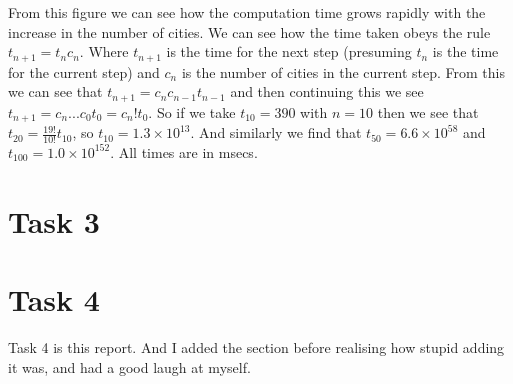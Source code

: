 \documentclass{article}
\begin{document}
From this figure we can see how the computation time grows rapidly with the increase in the number of cities. We can see how the time taken obeys the rule $t_{n+1} = t_n c_n$. Where $t_{n+1}$ is the time for the next step (presuming $t_n$ is the time for the current step) and $c_n$ is the number of cities in the current step. From this we can see that $t_{n+1}=c_n c_{n-1} t_{n-1}$ and then continuing this we see $t_{n+1} = c_n ... c_0 t_0 = c_n ! t_0$. So if we take $t_10 = 390$ with $n=10$ then we see that $t_20 = \frac{19!}{10!}t_{10}$, so $t_{10}=1.3 \times 10^{13}$. And similarly we find that $t_50=6.6 \times 10^{58}$ and $t_100 = 1.0 \times 10^{152}$. All times are in msecs.

\section{Task 3}


\section{Task 4}
Task 4 is this report. And I added the section before realising how stupid adding it was, and had a good laugh at myself.
\end{document}
